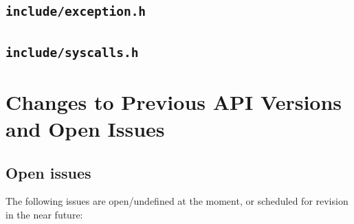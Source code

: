 \documentclass[a4paper,11pt,twoside,dvips]{report}
\begin{document}
\newpage
\section{\label{s:exception.h}\texttt{include/exception.h}}
{\small}

\newpage
\section{\label{s:syscalls.h}\texttt{include/syscalls.h}}
{\small}

\cleardoublepage

\fussy

\chapter{Changes to Previous API Versions and Open Issues}

\section{Open issues}

The following issues are open/undefined at the moment, or scheduled for
revision in the near future:
\end{document}
